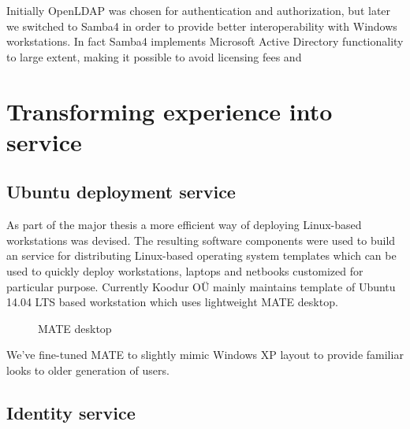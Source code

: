 \documentclass{article}
\begin{document}
Initially OpenLDAP was chosen for authentication and authorization,
but later we switched to Samba4 in order to provide better interoperability with
Windows workstations.
In fact Samba4 implements Microsoft Active Directory functionality to large extent,
making it possible to avoid licensing fees and 


\section{Transforming experience into service}

\subsection{Ubuntu deployment service}

As part of the major thesis a more efficient way of deploying Linux-based
workstations was devised.
The resulting software components were used to build an service for
distributing Linux-based operating system templates which can be used to
quickly deploy workstations, laptops and netbooks customized
for particular purpose.
Currently Koodur OÜ mainly maintains template of Ubuntu 14.04 LTS based
workstation which uses lightweight MATE desktop.

\begin{figure}[!htb]
\centering
{}
\caption{MATE desktop}
\label{fig:digraph}
\end{figure}

We've fine-tuned MATE to slightly mimic Windows XP layout to provide
familiar looks to older generation of users.


\subsection{Identity service}
\end{document}
